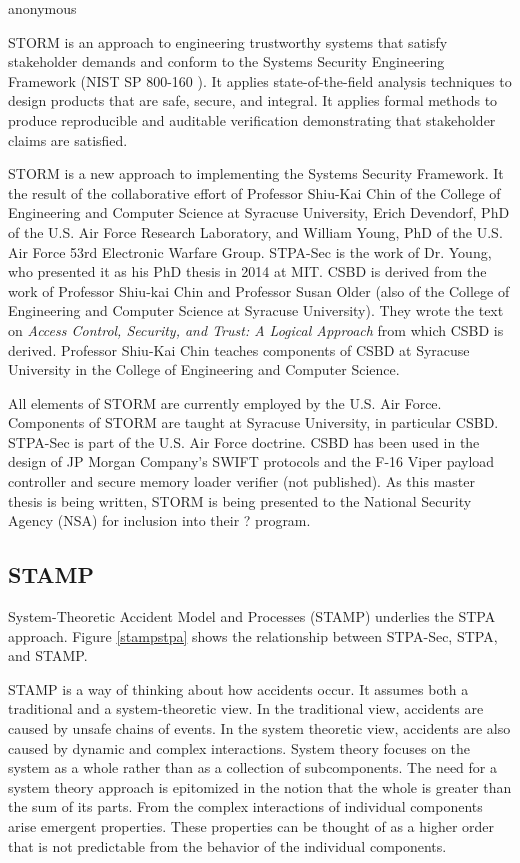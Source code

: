 \documentclass[../../main/main.tex]{subfiles}
\begin{document}
anonymous

STORM is an approach to engineering trustworthy systems that satisfy stakeholder demands and conform to the Systems Security Engineering Framework (NIST SP 800-160 \cite{}).  It applies state-of-the-field analysis techniques to design products that are safe, secure, and integral.  It applies formal methods to produce reproducible and auditable verification demonstrating that stakeholder claims are satisfied.


STORM is a new approach to implementing the Systems Security Framework.  It the result of the collaborative effort of Professor Shiu-Kai Chin of the College of Engineering and Computer Science at Syracuse University, Erich Devendorf, PhD of the U.S. Air Force Research Laboratory, and William Young, PhD of the U.S. Air Force 53rd Electronic Warfare Group.  STPA-Sec is the work of Dr. Young, who presented it as his PhD thesis in 2014 at MIT.  CSBD is derived from the work of Professor Shiu-kai Chin and Professor Susan Older (also of the College of Engineering and Computer Science at Syracuse University).  They wrote the text on \textit{Access Control, Security, and Trust: A Logical Approach} \cite{csbd} from which CSBD is derived.  Professor Shiu-Kai Chin teaches components of CSBD at Syracuse University in the College of Engineering and Computer Science.  


All elements of STORM are currently employed by the U.S. Air Force.  Components of STORM are taught at Syracuse University, in particular CSBD.  STPA-Sec is part of the U.S. Air Force doctrine.  CSBD has been used in the design of JP Morgan Company's SWIFT protocols \cite{} and the F-16 Viper payload controller and secure memory loader verifier (not published). As this master thesis is being written, STORM is being presented to the National Security Agency (NSA) for inclusion into their ? program.


\subsection{STAMP}\label{ssec:stamp}
System-Theoretic Accident Model and Processes (STAMP) underlies the STPA approach.  Figure \ref{stampstpa} shows the relationship between STPA-Sec, STPA, and STAMP.


STAMP is a way of thinking about how accidents occur.  It assumes both a traditional and a system-theoretic view.  In the traditional view, accidents are caused by unsafe chains of events.  In the system theoretic view, accidents are also caused by dynamic and complex interactions. System theory focuses on the system as a whole rather than as a collection of subcomponents.  The need for a system theory approach is epitomized in the notion that the whole is greater than the sum of its parts.  From the complex interactions of individual components arise emergent properties. These properties can be thought of as a higher order that is not predictable from the behavior of the individual components.
\end{document}
